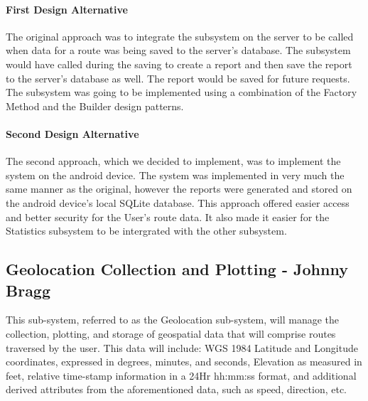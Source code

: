 ﻿\documentclass{article}
\begin{document}
\paragraph{First Design Alternative}
The original approach was to integrate the subsystem on the server to be called when data for a route was being saved to the server's database. The subsystem would have called during the saving to create a report and then save the report to the server's database as well. The report would be saved for future requests. The subsystem was going to be implemented using a combination of the Factory Method and the Builder design patterns.
\paragraph{Second Design Alternative}
The second approach, which we decided to implement, was to implement the system on the android device. The system was implemented in very much the same manner as the original, however the reports were generated and stored on the android device's local SQLite database. This approach offered easier access and better security for the User's route data. It also made it easier for the Statistics subsystem to be intergrated with the other subsystem. 


\subsection{Geolocation Collection and Plotting - Johnny Bragg}
This sub-system, referred to as the Geolocation sub-system, will manage the collection, plotting, and storage of geospatial data that will comprise routes traversed by the user. This data will include: WGS 1984 Latitude and Longitude coordinates, expressed in degrees, minutes, and seconds, Elevation as measured in feet, relative time-stamp information in a 24Hr hh:mm:ss format, and additional derived attributes from the aforementioned data, such as speed, direction, etc.
\end{document}
